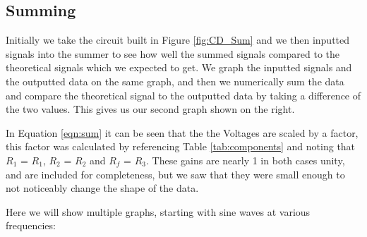 \subsection{Summing}

Initially we take the circuit built in Figure \ref{fig:CD_Sum} and we then inputted signals into the summer to see how well the summed signals compared to the theoretical signals which we expected to get. We graph the inputted signals and the outputted data on the same graph, and then we numerically sum the data and compare the theoretical signal to the outputted data by taking a difference of the two values. This gives us our second graph shown on the right.

In Equation \ref{eqn:sum} it can be seen that the the Voltages are scaled by a factor, this factor was calculated by referencing Table \ref{tab:components} and noting that $R_1$ = $R_1$, $R_2$ = $R_2$ and $R_f$ = $R_3$. These gains are nearly 1 in both cases unity, and are included for completeness, but we saw that they were small enough to not noticeably change the shape of the data.

Here we will show multiple graphs, starting with sine waves at various frequencies:

